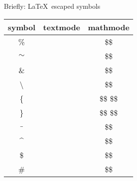 \begin{frame}[fragile]{Briefly: \LaTeX\ escaped symbols}\relax
\newcommand{\mccol}[1]{{\csk \$\ccol{#1}\$}}

\begin{center}
\begin{tabular}{c|cc}
    symbol & textmode & mathmode\\\hline
    \% & \ccol{\%} & \mccol{\%}\\ 
    $\sim$ & \ccol{\~} \ccol{\textasciitilde} & \mccol{\sim}\\ 
    \& &  \ccol{\&} &\mccol{\&}\\ 
    \textbackslash  & \ccol{\textbackslash} & \mccol{\backslash}\\ 
    \{ & \ccol{\{} \ccol{\textbraceleft} \ccol{\lbrace} & \mccol{\{} \mccol{\lbrace}\\
    \} & \ccol{\}} \ccol{\textbraceright} \ccol{\rbrace} & \mccol{\}} \mccol{\rbrace}\\
    $\_$ & \ccol{\_} & \mccol{\_}\\ 
    $\^$ & \ccol{\^} \ccol{\textasciicircum} & \mccol{\^}\\ 
    \$ & \ccol{\$} & \mccol{\$}\\ 
    \# & \ccol{\#} & \mccol{\#}
    
\end{tabular}
\end{center}
\end{frame}
